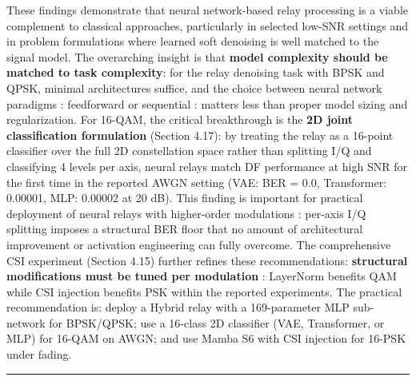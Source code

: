 These findings demonstrate that neural network-based relay processing is a viable complement to classical approaches, particularly in selected low-SNR settings and in problem formulations where learned soft denoising is well matched to the signal model. The overarching insight is that \textbf{model complexity should be matched to task complexity}: for the relay denoising task with BPSK and QPSK, minimal architectures suffice, and the choice between neural network paradigms : feedforward or sequential : matters less than proper model sizing and regularization. For 16-QAM, the critical breakthrough is the \textbf{2D joint classification formulation} (Section 4.17): by treating the relay as a 16-point classifier over the full 2D constellation space rather than splitting I/Q and classifying 4 levels per axis, neural relays match DF performance at high SNR for the first time in the reported AWGN setting (VAE: BER = 0.0, Transformer: 0.00001, MLP: 0.00002 at 20 dB). This finding is important for practical deployment of neural relays with higher-order modulations : per-axis I/Q splitting imposes a structural BER floor that no amount of architectural improvement or activation engineering can fully overcome. The comprehensive CSI experiment (Section 4.15) further refines these recommendations: \textbf{structural modifications must be tuned per modulation} : LayerNorm benefits QAM while CSI injection benefits PSK within the reported experiments. The practical recommendation is: deploy a Hybrid relay with a 169-parameter MLP sub-network for BPSK/QPSK; use a 16-class 2D classifier (VAE, Transformer, or MLP) for 16-QAM on AWGN; and use Mamba S6 with CSI injection for 16-PSK under fading.

\begin{center}\rule{0.5\linewidth}{0.5pt}\end{center}


